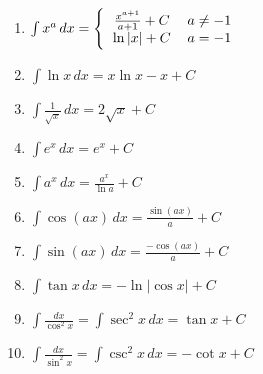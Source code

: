 \begin{center}
	\begin{small}
		\begin{enumerate}
			\item \begin{math}
				      \int x^a\,dx =
				      \Bigg\{\begin{tabular}{ccc}
					      $\frac{x^{a+1}}{a+1} + C$  & $a \neq -1$ & \\
					      $ \ln{\left|x\right|} + C$ & $a = -1$    & \\
				      \end{tabular}
			      \end{math}
			\item \begin{math}
				      \int \ln {x}\,dx = x \ln {x} - x + C
			      \end{math}
			\item \begin{math}
				      \int \frac {1}{\sqrt{x}}\,dx=2\sqrt{x} + C
			      \end{math}
			\item \begin{math}
				      \int e^x\,dx = e^x + C
			      \end{math}
			\item \begin{math}
				      \int a^x\,dx = \frac{a^x}{\ln{a}} + C
			      \end{math}
			\item \begin{math}
				      \int \cos({ax}) \, dx = { \frac{\sin (ax)}{a} } + C
			      \end{math}
			\item \begin{math}
				      \int \sin({ax}) \, dx = { \frac{-\cos(ax)}{a} } + C
			      \end{math}
			\item \begin{math}
				      \int \tan{x} \, dx = -\ln{\left| \cos {x} \right|} + C
			      \end{math}
			\item \begin{math}
				      \int \frac{dx}{\cos^2 x}=\int \sec^2 x \, dx = \tan x + C
			      \end{math}
			\item \begin{math}
				      \int \frac{dx}{\sin^2 x}=\int \csc^2 x \, dx = -\cot x + C
			      \end{math}

\end{enumerate}
\end{small}
\end{center}
